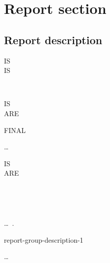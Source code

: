 \section{Report section}

\subsection{Report description}

 \reportname

\begin{0-1}
  IS  \\

   IS
  \begin{1=}
    \identifier
    \literal
  \end{1=} \\

  \begin{1=}
     IS \\
     ARE
  \end{1=}
  FINAL
  \begin{1=}
    \identifier
  \end{1=}\ldots \\

  \begin{0-1}
     IS \\
     ARE
  \end{0-1}
  \integer
  \begin{0-1}
     \\
  \end{0-1}
  \begin{0-1}
    \integer
    \begin{1=}
       \\
    \end{1=}
  \end{0-1}
\end{0-1}\ldots\ {}.\newline

\begin{1=}
  report-group-description-1
\end{1=}\ldots

